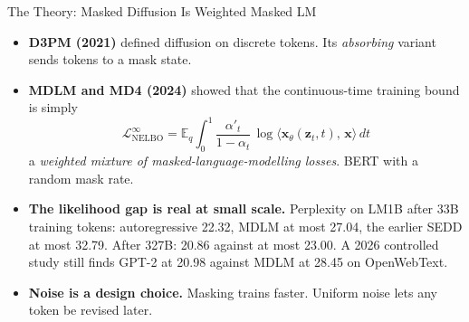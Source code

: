 \begin{frame}{The Theory: Masked Diffusion Is Weighted Masked LM}
    \begin{itemize}\itemsep0.35em
        \item \textbf{D3PM (2021)} defined diffusion on discrete tokens. Its \emph{absorbing} variant sends tokens to a mask state.
        \item \textbf{MDLM and MD4 (2024)} showed that the continuous-time training bound is simply
        \[
            \mathcal{L}^{\infty}_{\text{NELBO}} = \mathbb{E}_q \int_{0}^{1} \frac{\alpha'_t}{1-\alpha_t}\,\log\big\langle \mathbf{x}_\theta(\mathbf{z}_t,t),\,\mathbf{x}\big\rangle\,dt
        \]
        a \emph{weighted mixture of masked-language-modelling losses}. BERT with a random mask rate.
        \item \textbf{The likelihood gap is real at small scale.} Perplexity on LM1B after 33B training tokens: autoregressive 22.32, MDLM at most 27.04, the earlier SEDD at most 32.79. After 327B: 20.86 against at most 23.00. A 2026 controlled study still finds GPT-2 at 20.98 against MDLM at 28.45 on OpenWebText.
        \item \textbf{Noise is a design choice.} Masking trains faster. Uniform noise lets any token be revised later.
    \end{itemize}
\end{frame}


